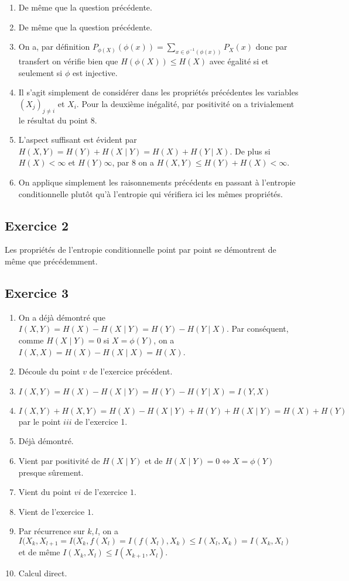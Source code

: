 \documentclass{cours}
\begin{document}
\begin{enumerate}
	\item De même que la question précédente.

	\item De même que la question précédente. 

	\item On a, par définition $P_{\phi(X)}(\phi(x)) = \sum_{x\in \phi^{-1}(\phi(x))} P_{X}(x)$ donc par transfert on vérifie bien que $H(\phi(X)) \leq H(X)$ avec égalité si et seulement si $\phi$ est injective. 

	\item Il s'agit simplement de considérer dans les propriétés précédentes les variables $(X_{j})_{j \neq i}$ et $X_{i}$. Pour la deuxième inégalité, par positivité on a trivialement le résultat du point $8$. 

	\item L'aspect suffisant est évident par $H(X, Y) = H(Y) + H(X \mid Y) = H(X) + H(Y\mid X)$. De plus si $H(X) < \infty$ et $H(Y) \infty$, par $8$ on a $H(X, Y) \leq H(Y) + H(X) < \infty$. 

	\item On applique simplement les raisonnements précédents en passant à l'entropie conditionnelle plutôt qu'à l'entropie qui vérifiera ici les mêmes propriétés. 
\end{enumerate}

\subsection{Exercice 2}
Les propriétés de l'entropie conditionnelle point par point se démontrent de même que précédemment. 

\subsection{Exercice 3}
\begin{enumerate}
	\item On a déjà démontré que $I(X, Y) = H(X) - H(X \mid Y) = H(Y) - H(Y \mid X)$. Par conséquent, comme $H(X\mid Y) = 0$ si $X = \phi(Y)$, on a $I(X, X) = H(X) - H(X \mid X) = H(X)$. 
	\item Découle du point $v$ de l'exercice précédent. 
	\item $I(X, Y) = H(X) - H(X \mid Y) = H(Y) - H(Y\mid X) = I(Y, X)$
	\item $I(X, Y) + H(X, Y) = H(X) - H(X \mid Y) + H(Y) + H(X \mid Y) = H(X) + H(Y)$ par le point $iii$ de l'exercice 1. 
	\item Déjà démontré. 
	\item Vient par positivité de $H(X \mid Y)$ et de $H(X \mid Y) = 0 \Leftrightarrow X = \phi(Y)$ presque sûrement. 
	\item Vient du point $vi$ de l'exercice $1$. 
	\item Vient de l'exercice $1$. 
	\item Par récurrence sur $k, l$, on a $I(X_{k}, X_{l + 1} = I(X_{k}, f(X_{l}) = I(f(X_{l}), X_{k}) \leq I(X_{l}, X_{k}) = I(X_{k}, X_{l})$ et de même $I(X_{k}, X_{l}) \leq I(X_{k + 1}, X_{l})$. 
	\item Calcul direct.

\end{enumerate}
\end{document}
